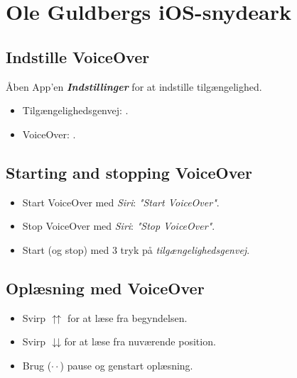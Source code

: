 \documentclass[a4paper, landscape, 10pt]{scrartcl}
\begin{document}
\thispagestyle{empty}

\section*{Ole Guldbergs \faApple iOS-snydeark \faUniversalAccess}

\hrulefill{}
\begin{multicols}{2}

\subsection*{Indstille VoiceOver}
Åben App'en \textbf{\textit{Indstillinger}} for at indstille tilgængelighed.
\begin{itemize}
  \item {Tilgængelighedsgenvej: .}
  \item {VoiceOver: .}
\end{itemize}

\subsection*{Starting and stopping VoiceOver}
\begin{itemize}
  \item{Start VoiceOver med \emph{Siri}: \textit{"Start VoiceOver"}.}
  \item{Stop VoiceOver med \emph{Siri}: \textit{"Stop VoiceOver"}.}
  \item {Start (og stop) med 3 tryk på \emph{tilgængelighedsgenvej}.}
\end{itemize}

\subsection*{Oplæsning med VoiceOver}
\begin{itemize}
  \item{Svirp $\upuparrows$ for at læse fra begyndelsen.}
  \item{Svirp $\downdownarrows$for at læse fra nuværende position.}
  \item{Brug ($\cdot\cdot$) pause og genstart oplæsning.}
\end{itemize}


\end{multicols}
\end{document}
